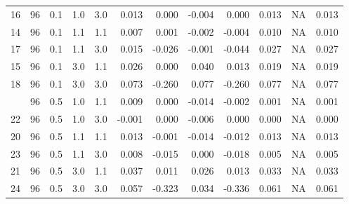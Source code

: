 \begin{longtable}[t]{cccccrrrrrrc}
16 & 96 & 0.1 & 1.0 & 3.0 & 0.013 & 0.000 & -0.004 & 0.000 & 0.013 & NA & 0.013\\
14 & 96 & 0.1 & 1.1 & 1.1 & 0.007 & 0.001 & -0.002 & -0.004 & 0.010 & NA & 0.010\\
17 & 96 & 0.1 & 1.1 & 3.0 & 0.015 & -0.026 & -0.001 & -0.044 & 0.027 & NA & 0.027\\
15 & 96 & 0.1 & 3.0 & 1.1 & 0.026 & 0.000 & 0.040 & 0.013 & 0.019 & NA & 0.019\\
18 & 96 & 0.1 & 3.0 & 3.0 & 0.073 & -0.260 & 0.077 & -0.260 & 0.077 & NA & 0.077\\
\addlinespace
19 & 96 & 0.5 & 1.0 & 1.1 & 0.009 & 0.000 & -0.014 & -0.002 & 0.001 & NA & 0.001\\
22 & 96 & 0.5 & 1.0 & 3.0 & -0.001 & 0.000 & -0.006 & 0.000 & 0.000 & NA & 0.000\\
20 & 96 & 0.5 & 1.1 & 1.1 & 0.013 & -0.001 & -0.014 & -0.012 & 0.013 & NA & 0.013\\
23 & 96 & 0.5 & 1.1 & 3.0 & 0.008 & -0.015 & 0.000 & -0.018 & 0.005 & NA & 0.005\\
21 & 96 & 0.5 & 3.0 & 1.1 & 0.037 & 0.011 & 0.026 & 0.013 & 0.033 & NA & 0.033\\
24 & 96 & 0.5 & 3.0 & 3.0 & 0.057 & -0.323 & 0.034 & -0.336 & 0.061 & NA & 0.061\\
\bottomrule
\end{longtable}

\endgroup{}